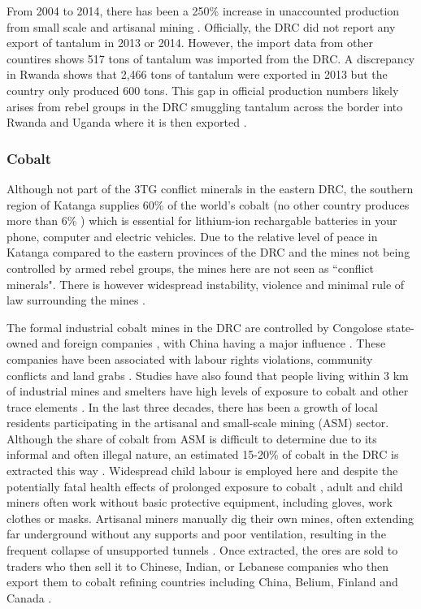 \documentclass{article}
\begin{document}
From 2004 to 2014, there has been a 250\% increase in unaccounted production from small scale and artisanal mining \cite{mancheri2018resilience}. Officially, the DRC did not report any export of tantalum in 2013 or 2014. However, the import data from other countires shows 517 tons of tantalum was imported from the DRC. A discrepancy in Rwanda shows that 2,466 tons of tantalum were exported in 2013 but the country only produced 600 tons. This gap in official production numbers likely arises from rebel groups in the DRC smuggling tantalum across the border into Rwanda and Uganda where it is then exported \cite{mancheri2018resilience}.

\subsubsection{Cobalt}
Although not part of the 3TG conflict minerals in the eastern DRC, the southern region of Katanga supplies 60\% of the world's cobalt (no other country produces more than 6\% \cite{shedd2017cobalt}) which is essential for lithium-ion rechargable batteries in your phone, computer and electric vehicles. Due to the relative level of peace in Katanga compared to the eastern provinces of the DRC and the mines not being controlled by armed rebel groups, the mines here are not seen as ``conflict minerals". There is however widespread instability, violence and minimal rule of law surrounding the mines \cite{scheele2016cobalt}.

The formal industrial cobalt mines in the DRC are controlled by Congolose state-owned and foreign companies \cite{scheele2016cobalt}, with China having a major influence \cite{gulley2019china}. These companies have been associated with labour rights violations, community conflicts and land grabs \cite{scheele2016cobalt}. Studies have also found that people living within 3 km of industrial mines and smelters have high levels of exposure to cobalt and other trace elements \cite{banza2009high}. In the last three decades, there has been a growth of local residents participating in the artisanal and small-scale mining (ASM) sector. Although the share of cobalt from ASM is difficult to determine due to its informal and often illegal nature, an estimated 15-20\% of cobalt in the DRC is extracted this way \cite{al2017cobalt}. Widespread child labour is employed here \cite{andre2014child} and despite the potentially fatal health effects of prolonged exposure to cobalt \cite{nkulu2018sustainability}, adult and child miners often work without basic protective equipment, including gloves, work clothes or masks.  Artisanal miners manually dig their own mines, often extending far underground without any supports and poor ventilation, resulting in the frequent collapse of unsupported tunnels \cite{al2017cobalt, amnesty2016drc}. Once extracted, the ores are sold to traders who then sell it to Chinese, Indian, or Lebanese companies who then export them to cobalt refining countries including China, Belium, Finland and Canada \cite{al2017cobalt}.
\end{document}
